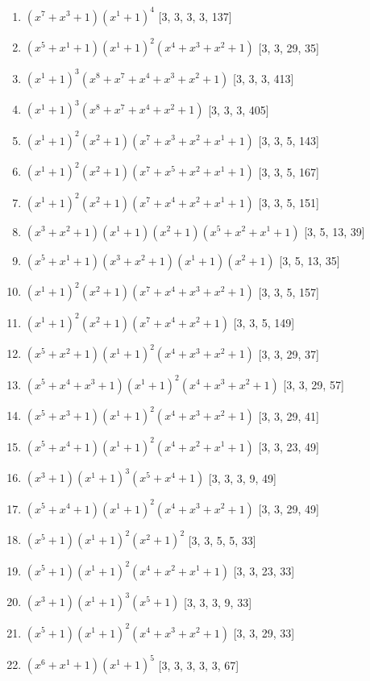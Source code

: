 \documentclass[10pt,twocolumn]{article}
\begin{document}
\begin{enumerate}
\item $(x^{7} + x^{3} + 1)(x^{1} + 1)^{4}$  [3, 3, 3, 3, 137]
\item $(x^{5} + x^{1} + 1)(x^{1} + 1)^{2}(x^{4} + x^{3} + x^{2} + 1)$  [3, 3, 29, 35]
\item $(x^{1} + 1)^{3}(x^{8} + x^{7} + x^{4} + x^{3} + x^{2} + 1)$  [3, 3, 3, 413]
\item $(x^{1} + 1)^{3}(x^{8} + x^{7} + x^{4} + x^{2} + 1)$  [3, 3, 3, 405]
\item $(x^{1} + 1)^{2}(x^{2} + 1)(x^{7} + x^{3} + x^{2} + x^{1} + 1)$  [3, 3, 5, 143]
\item $(x^{1} + 1)^{2}(x^{2} + 1)(x^{7} + x^{5} + x^{2} + x^{1} + 1)$  [3, 3, 5, 167]
\item $(x^{1} + 1)^{2}(x^{2} + 1)(x^{7} + x^{4} + x^{2} + x^{1} + 1)$  [3, 3, 5, 151]
\item $(x^{3} + x^{2} + 1)(x^{1} + 1)(x^{2} + 1)(x^{5} + x^{2} + x^{1} + 1)$  [3, 5, 13, 39]
\item $(x^{5} + x^{1} + 1)(x^{3} + x^{2} + 1)(x^{1} + 1)(x^{2} + 1)$  [3, 5, 13, 35]
\item $(x^{1} + 1)^{2}(x^{2} + 1)(x^{7} + x^{4} + x^{3} + x^{2} + 1)$  [3, 3, 5, 157]
\item $(x^{1} + 1)^{2}(x^{2} + 1)(x^{7} + x^{4} + x^{2} + 1)$  [3, 3, 5, 149]
\item $(x^{5} + x^{2} + 1)(x^{1} + 1)^{2}(x^{4} + x^{3} + x^{2} + 1)$  [3, 3, 29, 37]
\item $(x^{5} + x^{4} + x^{3} + 1)(x^{1} + 1)^{2}(x^{4} + x^{3} + x^{2} + 1)$  [3, 3, 29, 57]
\item $(x^{5} + x^{3} + 1)(x^{1} + 1)^{2}(x^{4} + x^{3} + x^{2} + 1)$  [3, 3, 29, 41]
\item $(x^{5} + x^{4} + 1)(x^{1} + 1)^{2}(x^{4} + x^{2} + x^{1} + 1)$  [3, 3, 23, 49]
\item $(x^{3} + 1)(x^{1} + 1)^{3}(x^{5} + x^{4} + 1)$  [3, 3, 3, 9, 49]
\item $(x^{5} + x^{4} + 1)(x^{1} + 1)^{2}(x^{4} + x^{3} + x^{2} + 1)$  [3, 3, 29, 49]
\item $(x^{5} + 1)(x^{1} + 1)^{2}(x^{2} + 1)^{2}$  [3, 3, 5, 5, 33]
\item $(x^{5} + 1)(x^{1} + 1)^{2}(x^{4} + x^{2} + x^{1} + 1)$  [3, 3, 23, 33]
\item $(x^{3} + 1)(x^{1} + 1)^{3}(x^{5} + 1)$  [3, 3, 3, 9, 33]
\item $(x^{5} + 1)(x^{1} + 1)^{2}(x^{4} + x^{3} + x^{2} + 1)$  [3, 3, 29, 33]
\item $(x^{6} + x^{1} + 1)(x^{1} + 1)^{5}$  [3, 3, 3, 3, 3, 67]

\end{enumerate}
\end{document}
